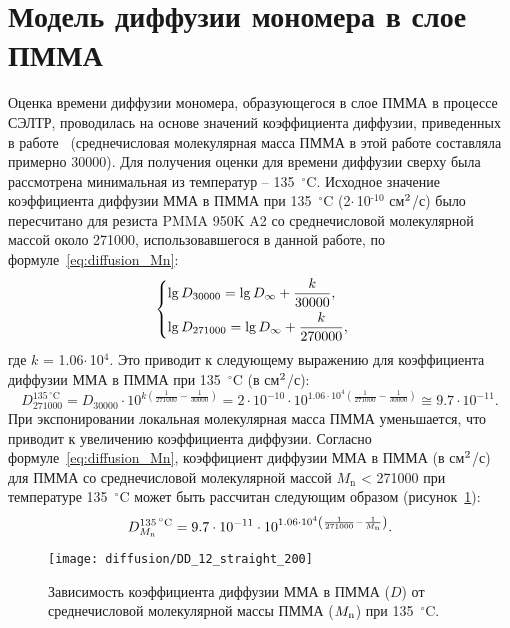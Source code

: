 \section{Модель диффузии мономера в слое ПММА}

Оценка времени диффузии мономера, образующегося в слое ПММА в процессе СЭЛТР, проводилась на основе значений коэффициента диффузии, приведенных в работе~\cite{Karlsson2001_diffusion} (среднечисловая молекулярная масса ПММА в этой работе составляла примерно 30000). Для получения оценки для времени диффузии сверху была рассмотрена минимальная из температур -- 135~$^\circ$C.
Исходное значение коэффициента диффузии ММА в ПММА при 135~$^\circ$C (2\:$\cdot$\,10$^\text{-10}$ см$^\text{2}$/с) было пересчитано для резиста PMMA 950K A2 со среднечисловой молекулярной массой около 271000, использовавшегося в данной работе, по формуле~\ref{eq:diffusion_Mn}:
\begin{equation}
	\begin{cases}
		\lg D_{30000} = \lg D_{\infty} + \displaystyle{\frac{k}{30000}}, \vspace{0.4em} \\
		\lg D_{271000} = \lg D_{\infty} + \displaystyle{\frac{k}{270000}},
	\end{cases}
\end{equation}
где $k$ = 1.06\:$\cdot$\,10$^\text{4}$. Это приводит к следующему выражению для коэффициента диффузии ММА в ПММА при 135~$^\circ$C (в см$^\text{2}$/с):
\begin{equation}
	D_{271000}^{135 \, ^\circ \mathrm{C}} = D_{30000} \cdot 10^{k \left(\frac{1}{271000} - \frac{1}{30000} \right)} = 2 \cdot 10^{-10} \cdot 10^{1.06 \cdot 10^4 \left(\frac{1}{271000} - \frac{1}{30000} \right)} \cong 9.7 \cdot 10^{-11}.
\end{equation}
При экспонировании локальная молекулярная масса ПММА уменьшается, что приводит к увеличению коэффициента диффузии. Согласно формуле~\ref{eq:diffusion_Mn}, коэффициент диффузии ММА в ПММА (в см$^\text{2}$/с) для ПММА со среднечисловой молекулярной массой $M_\mathrm{n}$ < 271000 при температуре 135~$^\circ$C может быть рассчитан следующим образом (рисунок~\ref{fig:Mn_diff}):
\begin{equation} \label{eq:D_Mn}
	D_{M_\mathrm{n}}^{135 \, ^\circ \mathrm{C}} = 9.7 \cdot 10^{-11} \cdot 10^{1.06 \cdot 10^4 \left( \frac{1}{271000} - \frac{1}{M_\mathrm{n}} \right)}.
\end{equation}

\begin{figure}[h]
	\begin{center}
		\texttt{[image: diffusion/DD\_12\_straight\_200]}
	\end{center}
	\vspace{-1em}
	\caption{Зависимость коэффициента диффузии ММА в ПММА ($D$) от среднечисловой молекулярной массы ПММА ($M_\mathrm{n}$) при 135~$^\circ$C.}
	\label{fig:Mn_diff}
\end{figure}

